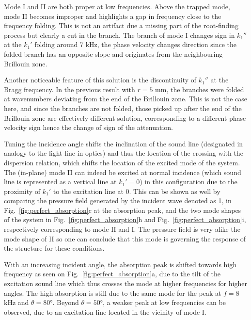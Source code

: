 Mode I and II are both proper at low frequencies. Above the trapped mode, mode II becomes improper and highlights a gap in frequency close to the frequency folding. This is not an artifact due a missing part of the root-finding process but clearly a cut in the branch. The branch of mode I changes sign in $k_1''$ at the $k_1'$ folding around 7 kHz, the phase velocity changes direction since the folded branch has an opposite slope and originates from the neighbouring Brillouin zone.

Another noticeable feature of this solution is the discontinuity of $k_1''$ at the Bragg frequency. In the previous result with $r = 5$ mm, the branches were folded at wavenumbers deviating from the end of the Brillouin zone. This is not the case here, and since the branches are not folded, those picked up after the end of the Brillouin zone are effectively different solution, corresponding to a different phase velocity sign hence the change of sign of the attenuation.

Tuning the incidence angle shifts the inclination of the sound line (designated in analogy to the light line in optics) and thus the location of the crossing with the dispersion relation, which shifts the location of the excited mode of the system. The (in-plane) mode II can indeed be excited at normal incidence (which sound line is represented as a vertical line at $k_1'=0$) in this configuration due to the proximity of $k_1'$ to the excitation line at 0. This can be shown as well by comparing the pressure field generated by the incident wave denoted as 1, in Fig.~\ref{fig:perfect_absorption}c at the absorption peak, and the two mode shapes of the system in Fig.~\ref{fig:perfect_absorption}h and Fig.~\ref{fig:perfect_absorption}i, respectively corresponding to mode II and I. The pressure field is very alike the mode shape of II so one can conclude that this mode is governing the response of the structure for these conditions. 

With an increasing incident angle, the absorption peak is shifted towards high frequency as seen on Fig.~\ref{fig:perfect_absorption}a, due to the tilt of the excitation sound line which thus crosses the mode at higher frequencies for higher angles. The high absorption is still due to the same mode for the peak at $f=8$ kHz and $\theta = 80$°. Beyond $\theta = 50$°, a weaker peak at low frequencies can be observed, due to an excitation line located in the vicinity of mode I. 

